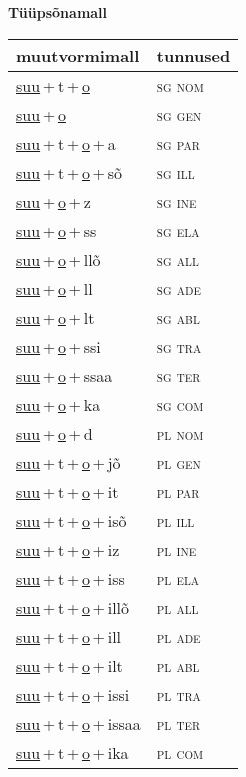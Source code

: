 
\vspace{1.8em}
\begin{minipage}{\textwidth}
\textbf{Tüüpsõnamall \,}\\

\begin{sideways}
\begin{tabular}{l l}
muutvormimall & tunnused \\
\hline
\underline{suu}\,+\,t\,+\,\underline{o} & \textsc{ sg nom } \\
\underline{suu}\,+\,\underline{o} & \textsc{ sg gen } \\
\underline{suu}\,+\,t\,+\,\underline{o}\,+\,a & \textsc{ sg par } \\
\underline{suu}\,+\,t\,+\,\underline{o}\,+\,sõ & \textsc{ sg ill } \\
\underline{suu}\,+\,\underline{o}\,+\,z & \textsc{ sg ine } \\
\underline{suu}\,+\,\underline{o}\,+\,ss & \textsc{ sg ela } \\
\underline{suu}\,+\,\underline{o}\,+\,llõ & \textsc{ sg all } \\
\underline{suu}\,+\,\underline{o}\,+\,ll & \textsc{ sg ade } \\
\underline{suu}\,+\,\underline{o}\,+\,lt & \textsc{ sg abl } \\
\underline{suu}\,+\,\underline{o}\,+\,ssi & \textsc{ sg tra } \\
\underline{suu}\,+\,\underline{o}\,+\,ssaa & \textsc{ sg ter } \\
\underline{suu}\,+\,\underline{o}\,+\,ka & \textsc{ sg com } \\
\underline{suu}\,+\,\underline{o}\,+\,d & \textsc{ pl nom } \\
\underline{suu}\,+\,t\,+\,\underline{o}\,+\,jõ & \textsc{ pl gen } \\
\underline{suu}\,+\,t\,+\,\underline{o}\,+\,it & \textsc{ pl par } \\
\underline{suu}\,+\,t\,+\,\underline{o}\,+\,isõ & \textsc{ pl ill } \\
\underline{suu}\,+\,t\,+\,\underline{o}\,+\,iz & \textsc{ pl ine } \\
\underline{suu}\,+\,t\,+\,\underline{o}\,+\,iss & \textsc{ pl ela } \\
\underline{suu}\,+\,t\,+\,\underline{o}\,+\,illõ & \textsc{ pl all } \\
\underline{suu}\,+\,t\,+\,\underline{o}\,+\,ill & \textsc{ pl ade } \\
\underline{suu}\,+\,t\,+\,\underline{o}\,+\,ilt & \textsc{ pl abl } \\
\underline{suu}\,+\,t\,+\,\underline{o}\,+\,issi & \textsc{ pl tra } \\
\underline{suu}\,+\,t\,+\,\underline{o}\,+\,issaa & \textsc{ pl ter } \\
\underline{suu}\,+\,t\,+\,\underline{o}\,+\,ika & \textsc{ pl com } \\
\end{tabular}
\end{sideways}
\label{tab:tüüpsõnamall-suuto}


\end{minipage}
